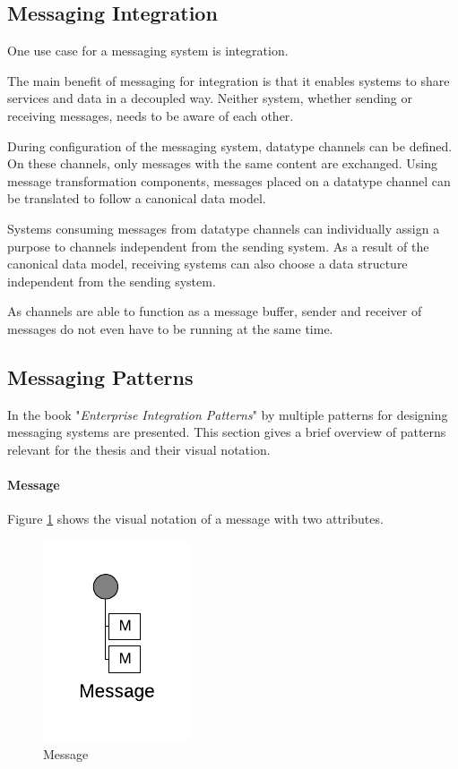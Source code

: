 \subsection{Messaging Integration}

One use case for a messaging system is integration.

The main benefit of messaging for integration is that it enables systems to share services and data in a decoupled way. Neither system, whether sending or receiving messages, needs to be aware of each other. 

During configuration of the messaging system, datatype channels can be defined. On these channels, only messages with the same content are exchanged. Using message transformation components, messages placed on a datatype channel can be translated to follow a canonical data model.

Systems consuming messages from datatype channels can individually assign a purpose to channels independent from the sending system. As a result of the canonical data model, receiving systems can also choose a data structure independent from the sending system.

As channels are able to function as a message buffer, sender and receiver of messages do not even have to be running at the same time.

\subsection{Messaging Patterns}

In the book "\textit{Enterprise Integration Patterns}" by \cite{EIP} multiple patterns for designing messaging systems are presented. This section gives a brief overview of patterns relevant for the thesis and their visual notation.

\paragraph{Message}

Figure \ref{messaging:message} shows the visual notation of a message with two attributes. 

\begin{figure}[H]
    \centering
    \includegraphics[scale=0.6]{Diagrams/Messaging/1. Message.pdf}
    \caption{Message}
    \label{messaging:message}
\end{figure}

